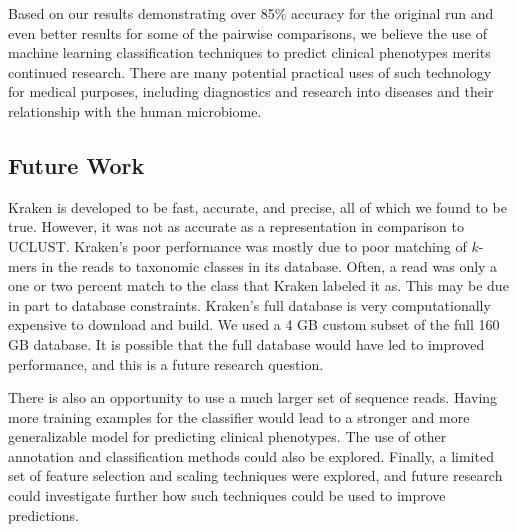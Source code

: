 Based on our results demonstrating over 85\% accuracy for the original run and even better results for some of the pairwise comparisons, we believe the use of machine learning
classification techniques to predict clinical phenotypes 
merits continued research. There are many potential practical 
uses of such technology for medical purposes, including 
diagnostics and research into diseases and their 
relationship with the human microbiome.

\subsection{Future Work}

Kraken is developed to be fast, accurate, and precise, all 
of which we found to be true. However, it was not as accurate as a representation in comparison to 
UCLUST. Kraken's poor performance was mostly due to  poor matching of $k$-mers in the reads to taxonomic classes in its database. Often, a read was only a one or two percent match to the class that Kraken labeled it as. This 
may be due in part to database constraints. Kraken's full database is very computationally expensive to download and build. We 
used a 4 GB custom subset of the full 160 GB database. It is 
possible that the full database would have led to improved performance, and this is 
a future research question.

There is also an opportunity to use a much larger set of sequence reads. Having more training examples for the classifier would  lead to a stronger and more generalizable model for predicting clinical phenotypes. The use of other annotation and classification methods could also be explored. Finally, a limited set of feature selection and scaling techniques were explored, and future research could investigate further how such techniques could be used to improve predictions.


